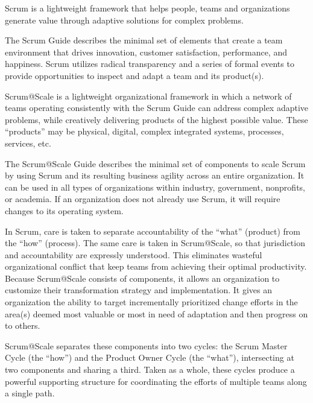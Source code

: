 \documentclass[12pt,a4paper,parskip=full]{scrartcl}
\begin{document}
Scrum is a lightweight framework that helps people, teams and organizations generate value through adaptive solutions for complex problems.

The Scrum Guide describes the minimal set of elements that create a team environment that drives innovation, customer satisfaction, performance, and happiness. Scrum utilizes radical transparency and a series of formal events to provide opportunities to inspect and adapt a team and its product(s).

Scrum@Scale is a lightweight organizational framework in which a network of teams operating consistently with the Scrum Guide can address complex adaptive problems, while creatively delivering products of the highest possible value. These ``products'' may be physical, digital, complex integrated systems, processes, services, etc.

The Scrum@Scale Guide describes the minimal set of components to scale Scrum by using Scrum and its resulting business agility across an entire organization. It can be used in all types of organizations within industry, government, nonprofits, or academia. If an organization does not already use Scrum, it will require changes to its operating system.

In Scrum, care is taken to separate accountability of the ``what'' (product) from the ``how'' (process). The same care is taken in Scrum@Scale, so that jurisdiction and accountability are expressly understood. This eliminates wasteful organizational conflict that keep teams from achieving their optimal productivity. Because Scrum@Scale consists of components, it allows an organization to customize their transformation strategy and implementation. It gives an organization the ability to target incrementally prioritized change efforts in the area(s) deemed most valuable or most in need of adaptation and then progress on to others.

Scrum@Scale separates these components into two cycles: the Scrum Master Cycle (the ``how'') and the Product Owner Cycle (the ``what''), intersecting at two components and sharing a third. Taken as a whole, these cycles produce a powerful supporting structure for coordinating the efforts of multiple teams along a single path.
\end{document}
